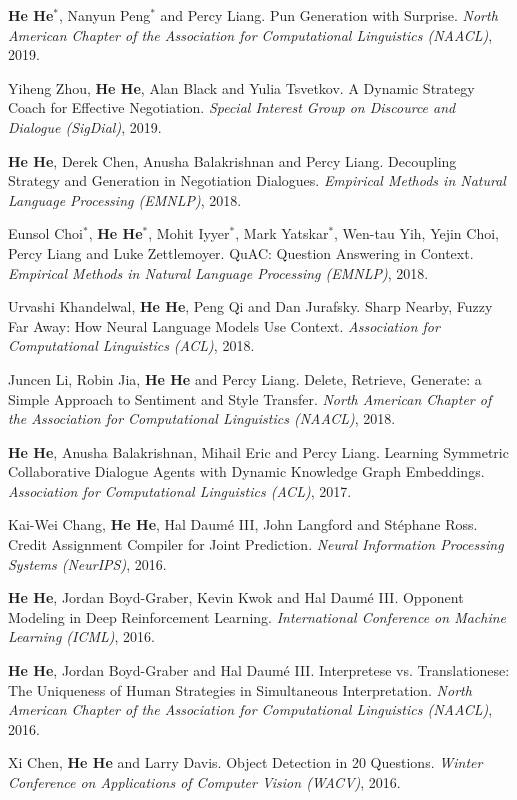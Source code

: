 \textbf{He He}$^*$, Nanyun Peng$^*$ and Percy Liang. Pun Generation with Surprise. \textit{North American Chapter of the Association for Computational Linguistics (NAACL)}, 2019.

Yiheng Zhou, \textbf{He He}, Alan Black and Yulia Tsvetkov. A Dynamic Strategy Coach for Effective Negotiation. \textit{Special Interest Group on Discource and Dialogue (SigDial)}, 2019.

\textbf{He He}, Derek Chen, Anusha Balakrishnan and Percy Liang. Decoupling Strategy and Generation in Negotiation Dialogues. \textit{Empirical Methods in Natural Language Processing (EMNLP)}, 2018.

Eunsol Choi$^*$, \textbf{He He}$^*$, Mohit Iyyer$^*$, Mark Yatskar$^*$, Wen-tau Yih, Yejin Choi, Percy Liang and Luke Zettlemoyer. QuAC: Question Answering in Context. \textit{Empirical Methods in Natural Language Processing (EMNLP)}, 2018.

Urvashi Khandelwal, \textbf{He He}, Peng Qi and Dan Jurafsky. Sharp Nearby, Fuzzy Far Away: How Neural Language Models Use Context. \textit{Association for Computational Linguistics (ACL)}, 2018.

Juncen Li, Robin Jia, \textbf{He He} and Percy Liang. Delete, Retrieve, Generate: a Simple Approach to Sentiment and Style Transfer. \textit{North American Chapter of the Association for Computational Linguistics (NAACL)}, 2018.

\textbf{He He}, Anusha Balakrishnan, Mihail Eric and Percy Liang. Learning Symmetric Collaborative Dialogue Agents with Dynamic Knowledge Graph Embeddings. \textit{Association for Computational Linguistics (ACL)}, 2017.

Kai-Wei Chang, \textbf{He He}, Hal Daum\'e III, John Langford and St\'ephane Ross. Credit Assignment Compiler for Joint Prediction. \textit{Neural Information Processing Systems (NeurIPS)}, 2016.

\textbf{He He}, Jordan Boyd-Graber, Kevin Kwok and Hal Daum\'e III. Opponent Modeling in Deep Reinforcement Learning. \textit{International Conference on Machine Learning (ICML)}, 2016.

\textbf{He He}, Jordan Boyd-Graber and Hal Daum\'e III. Interpretese vs. Translationese: The Uniqueness of Human Strategies in Simultaneous Interpretation. \textit{North American Chapter of the Association for Computational Linguistics (NAACL)}, 2016.

Xi Chen, \textbf{He He} and Larry Davis. Object Detection in 20 Questions. \textit{Winter Conference on Applications of Computer Vision (WACV)}, 2016.

